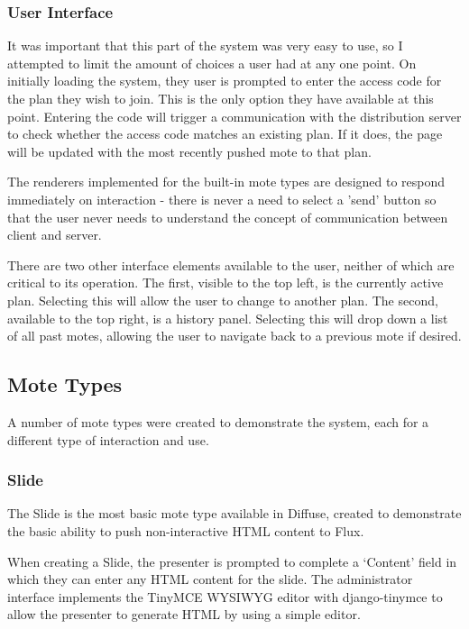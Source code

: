 \documentclass[a4papert,11pt,notitlepage]{ltxdoc}
\begin{document}

\subsubsection{User Interface}
It was important that this part of the system was very easy to use, so I attempted to limit the amount of choices a user had at any one point. On initially loading the system, they user is prompted to enter the access code for the plan they wish to join. This is the only option they have available at this point. Entering the code will trigger a communication with the distribution server to check whether the access code matches an existing plan. If it does, the page will be updated with the most recently pushed mote to that plan.

The renderers implemented for the built-in mote types are designed to respond immediately on interaction - there is never a need to select a 'send' button so that the user never needs to understand the concept of communication between client and server.

There are two other interface elements available to the user, neither of which are critical to its operation. The first, visible to the top left, is the currently active plan. Selecting this will allow the user to change to another plan. The second, available to the top right, is a history panel. Selecting this will drop down a list of all past motes, allowing the user to navigate back to a previous mote if desired.

\subsection{Mote Types}
A number of mote types were created to demonstrate the system, each for a different type of interaction and use.

\subsubsection{Slide}
The Slide is the most basic mote type available in Diffuse, created to demonstrate the basic ability to push non-interactive HTML content to Flux.

When creating a Slide, the presenter is prompted to complete a `Content' field in which they can enter any HTML content for the slide. The administrator interface implements the TinyMCE\cite{tinymce:web} WYSIWYG editor with django-tinymce\cite{djangotinymce:web} to allow the presenter to generate HTML by using a simple editor.
\end{document}
